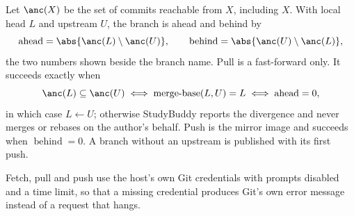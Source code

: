Let $\anc(X)$ be the set of commits reachable from $X$, including $X$. With
local head $L$ and upstream $U$, the branch is ahead and behind by
\begin{equation}
  \operatorname{ahead} = \abs{\anc(L) \setminus \anc(U)}, \qquad
  \operatorname{behind} = \abs{\anc(U) \setminus \anc(L)},
  \label{eq:ahead-behind}
\end{equation}
the two numbers shown beside the branch name. Pull is a fast-forward only. It
succeeds exactly when
\begin{equation}
  \anc(L) \subseteq \anc(U)
  \iff \operatorname{merge-base}(L, U) = L
  \iff \operatorname{ahead} = 0,
  \label{eq:fast-forward}
\end{equation}
in which case $L \leftarrow U$; otherwise StudyBuddy reports the divergence and
never merges or rebases on the author's behalf. Push is the mirror image and
succeeds when $\operatorname{behind} = 0$. A branch without an upstream is
published with its first push.

\begin{remark}
Fetch, pull and push use the host's own Git credentials with prompts disabled
and a time limit, so that a missing credential produces Git's own error message
instead of a request that hangs.
\end{remark}
